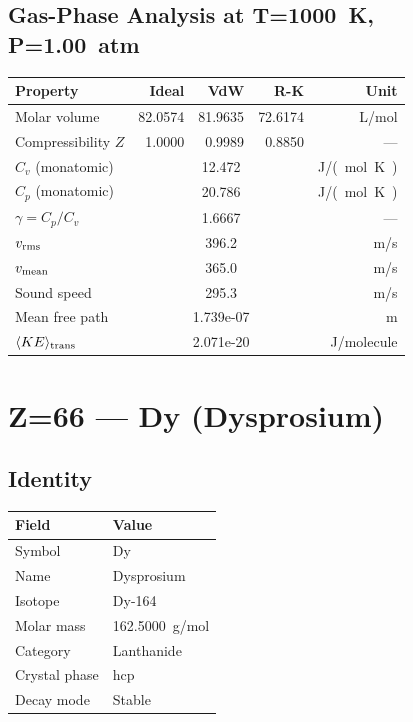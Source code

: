 \documentclass[11pt,a4paper]{article}
\begin{document}
\subsection{Gas-Phase Analysis at T=\SI{1000}{K}, P=\SI{1.00}{atm}}
\begin{tabular}{lrrrr}
  \toprule
  Property & Ideal & VdW & R-K & Unit \\
  \midrule
  Molar volume & 82.0574 & 81.9635 & 72.6174 & \si{L/mol} \\
  Compressibility $Z$ & 1.0000 & 0.9989 & 0.8850 & --- \\
  \midrule
  $C_v$ (monatomic) & \multicolumn{3}{c}{12.472} & \si{J/(mol.K)} \\
  $C_p$ (monatomic) & \multicolumn{3}{c}{20.786} & \si{J/(mol.K)} \\
  $\gamma = C_p/C_v$ & \multicolumn{3}{c}{1.6667} & --- \\
  $v_{\rm rms}$ & \multicolumn{3}{c}{396.2} & \si{m/s} \\
  $v_{\rm mean}$ & \multicolumn{3}{c}{365.0} & \si{m/s} \\
  Sound speed & \multicolumn{3}{c}{295.3} & \si{m/s} \\
  Mean free path & \multicolumn{3}{c}{1.739e-07} & \si{m} \\
  $\langle KE \rangle_{\rm trans}$ & \multicolumn{3}{c}{2.071e-20} & \si{J/molecule} \\
  \bottomrule
\end{tabular}

\newpage

\section{Z=66 --- Dy (Dysprosium)}
\label{sec:Z66}

\subsection{Identity}
\begin{tabular}{ll}
  \toprule
  Field & Value \\
  \midrule
  Symbol & Dy \\
  Name & Dysprosium \\
  Isotope & Dy-164 \\
  Molar mass & \SI{162.5000}{g/mol} \\
  Category & Lanthanide \\
  Crystal phase & hcp \\
  Decay mode & Stable \\
  \bottomrule
\end{tabular}
\end{document}
